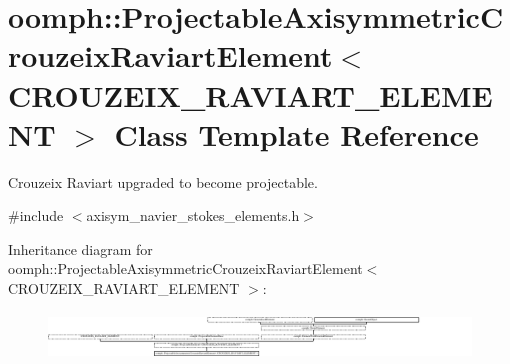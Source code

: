 \hypertarget{classoomph_1_1ProjectableAxisymmetricCrouzeixRaviartElement}{}\section{oomph\+:\+:Projectable\+Axisymmetric\+Crouzeix\+Raviart\+Element$<$ C\+R\+O\+U\+Z\+E\+I\+X\+\_\+\+R\+A\+V\+I\+A\+R\+T\+\_\+\+E\+L\+E\+M\+E\+NT $>$ Class Template Reference}
\label{classoomph_1_1ProjectableAxisymmetricCrouzeixRaviartElement}


Crouzeix Raviart upgraded to become projectable.  




{\ttfamily \#include $<$axisym\+\_\+navier\+\_\+stokes\+\_\+elements.\+h$>$}

Inheritance diagram for oomph\+:\+:Projectable\+Axisymmetric\+Crouzeix\+Raviart\+Element$<$ C\+R\+O\+U\+Z\+E\+I\+X\+\_\+\+R\+A\+V\+I\+A\+R\+T\+\_\+\+E\+L\+E\+M\+E\+NT $>$\+:\begin{figure}[H]
\begin{center}
\leavevmode
\includegraphics[height=1.277372cm]{classoomph_1_1ProjectableAxisymmetricCrouzeixRaviartElement}
\end{center}
\end{figure}
